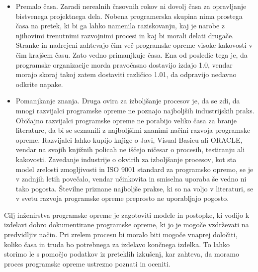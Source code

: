 \documentclass[a4paper,12pt,openright]{book}
\begin{document}
\begin{itemize}
    \item Premalo časa. Zaradi nerealnih časovnih rokov ni dovolj časa za opravljanje bistvenega projektnega dela. Nobena programerska skupina nima prostega časa na pretek, ki bi ga lahko namenila raziskovanju, kaj je narobe z njihovimi trenutnimi razvojnimi procesi in kaj bi morali delati drugače. Stranke in nadrejeni zahtevajo čim več programske opreme visoke kakovosti v čim krajšem času. Zato vedno primanjkuje časa. Ena od posledic tega je, da programske organizacije morda pravočasno dostavijo izdajo 1.0, vendar morajo skoraj takoj zatem dostaviti različico 1.01, da odpravijo nedavno odkrite napake.
    \item Pomanjkanje znanja. Druga ovira za izboljšanje procesov je, da se zdi, da mnogi razvijalci programske opreme ne poznajo najboljših industrijskih praks. Običajno razvijalci programske opreme ne porabijo veliko časa za branje literature, da bi se seznanili z najboljšimi znanimi načini razvoja programske opreme. Razvijalci lahko kupijo knjige o Javi, Visual Basicu ali ORACLE, vendar na svojih knjižnih policah ne iščejo ničesar o procesih, testiranju ali kakovosti.
Zavedanje industrije o okvirih za izboljšanje procesov, kot sta model zrelosti zmogljivosti in ISO 9001 standard za programsko opremo, se je v zadnjih letih povečalo, vendar učinkovita in smiselna uporaba še vedno ni tako pogosta. Številne priznane najboljše prakse, ki so na voljo v literaturi, se v svetu razvoja programske opreme preprosto ne uporabljajo pogosto. \cite{aggarwal2005software}
\end{itemize}
Cilj inženirstva programske opreme je zagotoviti modele in postopke, ki vodijo k izdelavi dobro dokumentirane programske opreme, ki jo je mogoče vzdrževati na predvidljiv način. Pri zrelem procesu bi moralo biti mogoče vnaprej določiti, koliko časa in truda bo potrebnega za izdelavo končnega izdelka. To lahko storimo le s pomočjo podatkov iz preteklih izkušenj, kar zahteva, da moramo proces programske opreme ustrezno poznati in oceniti. 
\end{document}
